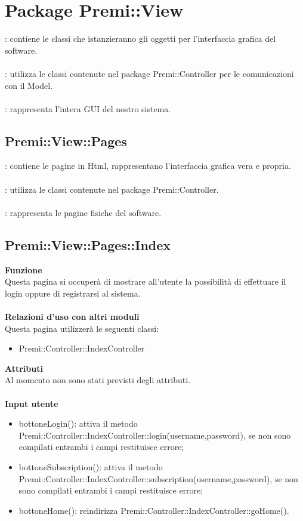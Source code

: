 \section{Package Premi::View}{
		\textbf{\tipo}: contiene le classi che istanzieranno gli oggetti per l'interfaccia grafica del software.\\\\
		\textbf{\relaz}: utilizza le classi contenute nel package Premi::Controller per le comunicazioni con il Model.\\\\
		\textbf{\attivita}: rappresenta l'intera GUI del nostro sistema.
		\subsection{Premi::View::Pages}{
			\textbf{\tipo}: contiene le pagine in Html, rappresentano l'interfaccia grafica vera e propria.\\\\
			\textbf{\relaz}: utilizza le classi contenute nel package Premi::Controller.\\\\
			\textbf{\attivita}: rappresenta le pagine fisiche del software.
			}
			\subsection{Premi::View::Pages::Index}{
					\textbf{Funzione}\\
						\indent Questa pagina si occuperà di mostrare all'utente la possibilità di effettuare il login oppure di registrarsi al sistema.\\\\
					\textbf{Relazioni d'uso con altri moduli}\\
						\indent Questa pagina utilizzerà le seguenti classi:
					\begin{itemize}
						\item Premi::Controller::IndexController
					\end{itemize}
					\textbf{Attributi}\\
						\indent Al momento non sono stati previsti degli attributi.\\\\
					\textbf{Input utente}
						\begin{itemize}
						\item bottoneLogin(): attiva il metodo Premi::Controller::IndexController::login(username,password), se non sono compilati entrambi i campi restituisce errore;
						\item bottoneSubscription(): attiva il metodo Premi::Controller::IndexController::subscription(username,password), se non sono compilati entrambi i campi restituisce errore;
						\item bottoneHome(): reindirizza Premi::Controller::IndexController::goHome().
					\end{itemize}
				}
}
